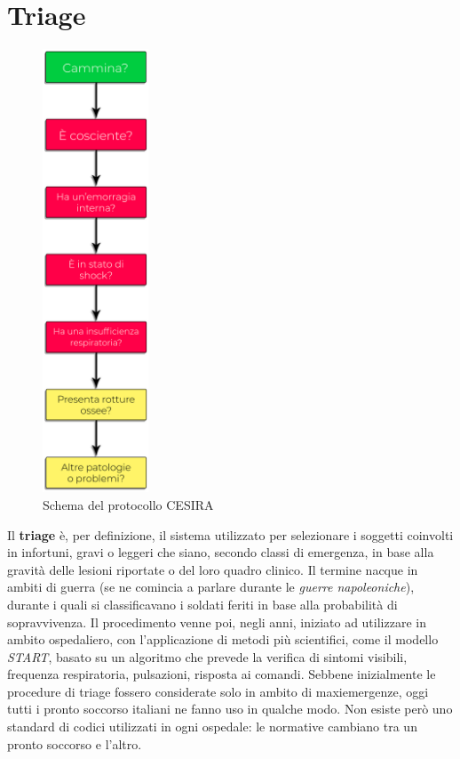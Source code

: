 \section{Triage}
\begin{figure}
    \begin{center}
        \includegraphics[width=0.28\textwidth]{images/Schema-CESIRA-ombra.png}
    \end{center}
    \caption{Schema del protocollo CESIRA}
\end{figure}
Il \textbf{triage} è, per definizione, il sistema utilizzato per selezionare i soggetti coinvolti in infortuni, gravi o leggeri che siano, secondo classi di emergenza, in base alla gravità delle lesioni riportate o del loro quadro clinico. Il termine nacque in ambiti di guerra (se ne comincia a parlare durante le \textit{guerre napoleoniche}), durante i quali si classificavano i soldati feriti in base alla probabilità di sopravvivenza. Il procedimento venne poi, negli anni, iniziato ad utilizzare in ambito ospedaliero, con l'applicazione di metodi più scientifici, come il modello \textit{START}, basato su un algoritmo che prevede la verifica di sintomi visibili, frequenza respiratoria, pulsazioni, risposta ai comandi. Sebbene inizialmente le procedure di triage fossero considerate solo in ambito di maxiemergenze, oggi tutti i pronto soccorso italiani ne fanno uso in qualche modo. Non esiste però uno standard di codici utilizzati in ogni ospedale: le normative cambiano tra un pronto soccorso e l'altro.
